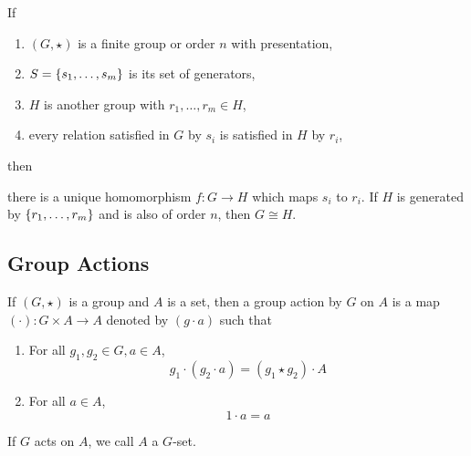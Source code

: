 \documentclass[a5paper]{article}
\begin{document}
\begin{theorem}
  If
  \begin{enumerate}%
    \item $(G,\star)$ is a finite group or order $n$ with presentation,
    \item $S=\left\{s_1,\ldots,s_m\right\}$ is its set of generators,
    \item $H$ is another group with $r_1,\ldots,r_m\in H$,
    \item every relation satisfied in $G$ by $s_i$ is satisfied in $H$ by $r_i$,
  \end{enumerate}
  then
  \begin{conclusion}
    there is a unique homomorphism $f:G\to H$ which maps $s_i$ to $r_i$. If $H$
    is generated by $\left\{r_1,\ldots,r_m\right\}$ and is also of order $n$, then
    $G\cong H$.
  \end{conclusion}
\end{theorem}

\subsection{Group Actions}

\begin{definition}
	If $(G,\star)$ is a group and $A$ is a set, then a group action by $G$ on $A$
  is a map $(\cdot):G\times A\to A$ denoted by $(g\cdot a)$ such that
  \begin{enumerate}%
    \item For all $g_1,g_2\in G,a\in A$,
    \begin{equation*}
      g_1\cdot(g_2\cdot a)=(g_1\star g_2)\cdot A
    \end{equation*}
    \item For all $a\in A$,
    \begin{equation*}
     1\cdot a=a
    \end{equation*}
  \end{enumerate}
  If $G$ acts on $A$, we call $A$ a $G$-set.
\end{definition}
\end{document}
